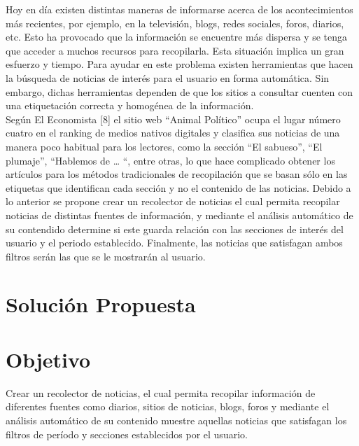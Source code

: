 \documentclass{book}
\begin{document}
Hoy en día existen distintas maneras de informarse acerca de los acontecimientos más recientes, por ejemplo, en la televisión, blogs, redes sociales, foros, diarios, etc. Esto ha provocado que la información se encuentre más dispersa y se tenga que acceder a muchos recursos para recopilarla. Esta situación implica un gran esfuerzo y tiempo. Para ayudar en este problema existen herramientas que hacen la búsqueda de noticias de interés para el usuario en forma automática. Sin embargo, dichas herramientas dependen de que los sitios a consultar cuenten con una etiquetación correcta y homogénea de la información.\\

Según El Economista [8] el sitio web “Animal Político” ocupa el lugar número cuatro en el ranking de medios nativos digitales y clasifica sus noticias de una manera poco habitual para los lectores, como la sección “El sabueso”, “El plumaje”, “Hablemos de … “, entre otras, lo que hace complicado obtener los artículos para los métodos tradicionales de recopilación que se basan sólo en las etiquetas que identifican cada sección y no el contenido de las noticias.
Debido a lo anterior se propone crear un recolector de noticias el cual permita recopilar noticias de distintas fuentes de información, y mediante el análisis automático de su contendido determine si este guarda relación con las secciones de interés del usuario y el periodo establecido. Finalmente, las noticias que satisfagan ambos filtros serán las que se le mostrarán al usuario.

\section{Solución Propuesta}




\section{Objetivo}

  Crear un recolector de noticias, el cual permita recopilar información de diferentes fuentes como diarios, sitios de noticias, blogs, foros y mediante el análisis automático de su contenido muestre aquellas noticias que satisfagan los filtros de período y secciones establecidos por el usuario.
  
\end{document}
